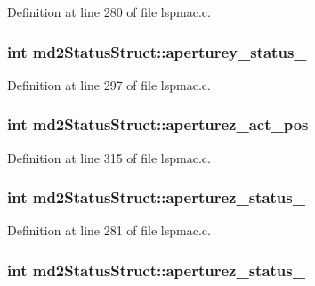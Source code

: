 Definition at line 280 of file lspmac.\-c.

\hypertarget{structmd2StatusStruct_a0a7738f13a0fa80626cafc2299b104b4}{
\subsubsection[{aperturey\-\_\-status\-\_\-2}]{\setlength{\rightskip}{0pt plus 5cm}int md2\-Status\-Struct\-::aperturey\-\_\-status\-\_}}\label{structmd2StatusStruct_a0a7738f13a0fa80626cafc2299b104b4}


Definition at line 297 of file lspmac.\-c.

\hypertarget{structmd2StatusStruct_a62d584ce23cfd9aa626d3c03649b455c}{
\subsubsection[{aperturez\-\_\-act\-\_\-pos}]{\setlength{\rightskip}{0pt plus 5cm}int md2\-Status\-Struct\-::aperturez\-\_\-act\-\_\-pos}}\label{structmd2StatusStruct_a62d584ce23cfd9aa626d3c03649b455c}


Definition at line 315 of file lspmac.\-c.

\hypertarget{structmd2StatusStruct_a27880dd795e1ba4fea4870c64ee3aa84}{
\subsubsection[{aperturez\-\_\-status\-\_\-1}]{\setlength{\rightskip}{0pt plus 5cm}int md2\-Status\-Struct\-::aperturez\-\_\-status\-\_}}\label{structmd2StatusStruct_a27880dd795e1ba4fea4870c64ee3aa84}


Definition at line 281 of file lspmac.\-c.

\hypertarget{structmd2StatusStruct_ae407a99e428d9f4a7444a02c8bc3414e}{
\subsubsection[{aperturez\-\_\-status\-\_\-2}]{\setlength{\rightskip}{0pt plus 5cm}int md2\-Status\-Struct\-::aperturez\-\_\-status\-\_}}\label{structmd2StatusStruct_ae407a99e428d9f4a7444a02c8bc3414e}


